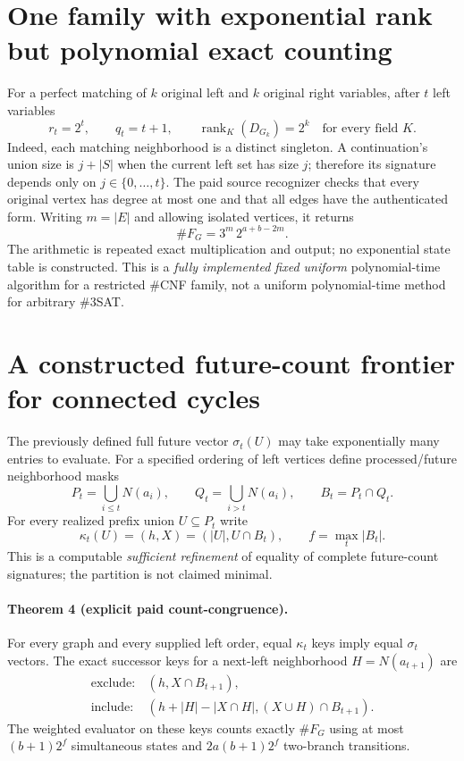\documentclass[11pt]{article}
\begin{document}
\section{One family with exponential rank but polynomial exact counting}
For a perfect matching of $k$ original left and $k$ original right variables, after $t$ left variables
\[
r_t=2^t,\qquad
q_t=t+1,\qquad
\operatorname{rank}_K(D_{G_k})=2^k
\quad\text{for every field }K.
\]
Indeed, each matching neighborhood is a distinct singleton. A continuation's union size is $j+|S|$ when the current left set has size $j$; therefore its signature depends only on $j\in\{0,\ldots,t\}$. The paid source recognizer checks that every original vertex has degree at most one and that all edges have the authenticated form. Writing $m=|E|$ and allowing isolated vertices, it returns
\[
\boxed{\#F_G=3^m\,2^{a+b-2m}.}
\]
The arithmetic is repeated exact multiplication and output; no exponential state table is constructed. This is a \emph{fully implemented fixed uniform} polynomial-time algorithm for a restricted \#CNF family, not a uniform polynomial-time method for arbitrary \#3SAT.


\section{A constructed future-count frontier for connected cycles}
The previously defined full future vector $\sigma_t(U)$ may take exponentially many entries to evaluate. For a specified ordering of left vertices define processed/future neighborhood masks
\[
P_t=\bigcup_{i\le t}N(a_i),\qquad Q_t=\bigcup_{i>t}N(a_i),\qquad B_t=P_t\cap Q_t.
\]
For every realized prefix union $U\subseteq P_t$ write
\[
\kappa_t(U)=(h,X)=(|U|,U\cap B_t),\qquad f=\max_t|B_t|.
\]
This is a computable \emph{sufficient refinement} of equality of complete future-count signatures; the partition is not claimed minimal.

\paragraph{Theorem 4 (explicit paid count-congruence).}
For every graph and every supplied left order, equal $\kappa_t$ keys imply equal $\sigma_t$ vectors. The exact successor keys for a next-left neighborhood $H=N(a_{t+1})$ are
\[
\begin{array}{ll}
\mathrm{exclude}:&(h,X\cap B_{t+1}),\\
\mathrm{include}:&(h+|H|-|X\cap H|,(X\cup H)\cap B_{t+1}).
\end{array}
\]
The weighted evaluator on these keys counts exactly $\#F_G$ using at most $(b+1)2^f$ simultaneous states and $2a(b+1)2^f$ two-branch transitions.
\end{document}
